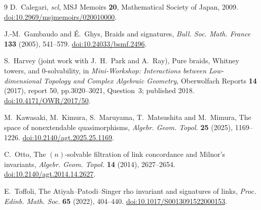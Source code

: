 \documentclass[11pt]{article}
\begin{document}
\begin{thebibliography}{9}
 D.~Calegari, \emph{scl}, MSJ Memoirs \textbf{20},
Mathematical Society of Japan, 2009.
\href{https://doi.org/10.2969/msjmemoirs/020010000}{doi:10.2969/msjmemoirs/020010000}.

 J.-M.~Gambaudo and \'E.~Ghys, Braids and signatures,
\emph{Bull. Soc. Math. France} \textbf{133} (2005), 541--579.
\href{https://doi.org/10.24033/bsmf.2496}{doi:10.24033/bsmf.2496}.

 S.~Harvey (joint work with J.~H.~Park and A.~Ray),
Pure braids, Whitney towers, and $0$-solvability, in
\emph{Mini-Workshop: Interactions between Low-dimensional Topology and Complex Algebraic Geometry}, Oberwolfach Reports \textbf{14} (2017),
report 50, pp.3020--3021, Question~3; published 2018.
\href{https://doi.org/10.4171/OWR/2017/50}{doi:10.4171/OWR/2017/50}.

 M.~Kawasaki, M.~Kimura, S.~Maruyama,
T.~Matsushita and M.~Mimura, The space of nonextendable quasimorphisms,
\emph{Algebr. Geom. Topol.} \textbf{25} (2025), 1169--1226.
\href{https://doi.org/10.2140/agt.2025.25.1169}{doi:10.2140/agt.2025.25.1169}.

 C.~Otto, The $(n)$-solvable filtration of link concordance
and Milnor's invariants, \emph{Algebr. Geom. Topol.} \textbf{14}
(2014), 2627--2654.
\href{https://doi.org/10.2140/agt.2014.14.2627}{doi:10.2140/agt.2014.14.2627}.

 E.~Toffoli, The Atiyah--Patodi--Singer rho invariant
and signatures of links, \emph{Proc. Edinb. Math. Soc.} \textbf{65}
(2022), 404--440.
\href{https://doi.org/10.1017/S0013091522000153}{doi:10.1017/S0013091522000153}.
\end{thebibliography}
\end{document}

